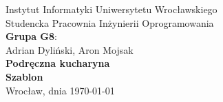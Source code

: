 \documentclass[a4paper,11pt,titlepage,twoside]{mwart}
\begin{document}
\begin{titlepage}
\begin{center}
\large{Instytut Informatyki Uniwersytetu Wrocławskiego\\Studencka Pracownia Inżynierii Oprogramowania}\\[3.0cm]
\Large {\bfseries Grupa G8}:\\
\large Adrian Dyliński, Aron Mojsak\\[4.0cm]
{ \Huge \bfseries Podręczna kucharyna}\\[0.5cm]
{ \large \bfseries Szablon}\\
\vfill
{\large Wrocław, dnia \today}
\end{center}
\end{titlepage}

\mbox{}
\thispagestyle{empty}
\newpage
\setcounter{page}{1}
\tableofcontents
\newpage
\end{document}
